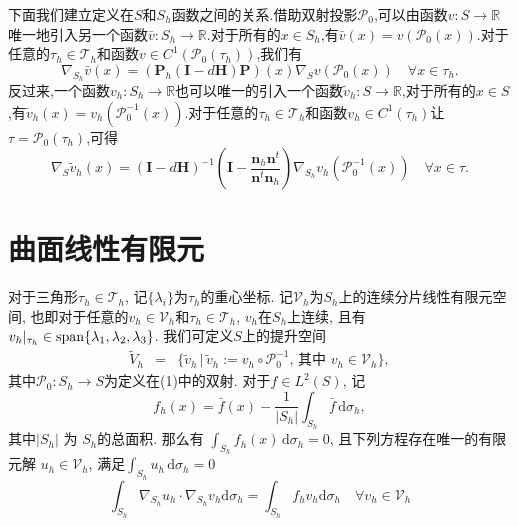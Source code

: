 \documentclass{article}
\begin{document}
下面我们建立定义在$S$和$S_h$函数之间的关系.借助双射投影$\mathcal{P}_0$,可以由函数$v:S\rightarrow\mathbb{R}$唯一地引入另一个函数$\bar{v}:S_h\rightarrow\mathbb{R}$.对于所有的$x\in S_h$,有$\bar{v}(x)=v(\mathcal{P}_0(x))$.对于任意的$\tau_h\in\mathcal{T}_h$和函数$v\in C^1(\mathcal{P}_0(\tau_h))$,我们有
\begin{equation*}
\nabla_{S_h}\bar{v}(x)=(\boldsymbol{P}_h(\boldsymbol{I}-d\boldsymbol{H})\boldsymbol{P})(x)\nabla_{S}v(\mathcal{P}_0(x))\quad\forall x\in \tau_h.
\end{equation*}
反过来,一个函数$v_h:S_h\rightarrow\mathbb{R}$也可以唯一的引入一个函数$\tilde{v}_h:S\rightarrow\mathbb{R}$,对于所有的$x\in S$,有$\tilde{v}_h(x)=v_h(\mathcal{P}^{-1}_0(x))$.对于任意的$\tau_h\in\mathcal{T}_h$和函数$v_h\in C^1(\tau_h)$让$\tau=\mathcal{P}_0(\tau_h)$,可得
\begin{equation*}
\nabla_{S}\tilde{v}_h(x)=(\boldsymbol{I}-d\boldsymbol{H})^{-1}\left(\boldsymbol{I}-\frac{\boldsymbol{n}_h\boldsymbol{n}^t}{\boldsymbol{n}^t\boldsymbol{n}_h}\right)\nabla_{S_h}v_h(\mathcal{P}^{-1}_0(x))\quad\forall x\in\tau.
\end{equation*}

\newpage

\section{曲面线性有限元}

对于三角形$\tau_h\in\mathcal{T}_h$, 记$\{\lambda_i\}$为$\tau_h$的重心坐标.   
记$\mathcal V_h$为$S_h$上的连续分片线性有限元空间, 也即对于任意的$v_h\in \mathcal V_h$和$\tau_h \in \mathcal T_h$,
$v_h$在$S_h$上连续, 且有$v_h|_{\tau_h}\in {\rm span}\{\lambda_1,\lambda_2,\lambda_3\}$.  
我们可定义$S$上的提升空间
\begin{eqnarray*}
 \tilde{V}_{h} & = &
\{\tilde{v}_{h} \, | \, \tilde{v}_{h}:=v_{h}\circ\mathcal{P}_{0}^{-1},\,
\text{其中 }v_{h}\in \mathcal V_h\},
\end{eqnarray*}
其中$\mathcal P_0: S_h \to S$为定义在(1)中的双射.   
对于$f\in L^{2}(S)$, 记
\begin{equation}\label{eq:fh}
f_{h}(x)=\bar{f}(x)-\frac{1}{|S_{h}|}\int_{S_{h}} \bar f \, \mathrm{d}\sigma_{h},
\end{equation}
其中$|S_{h}|$ 为 $ S_{h}$的总面积. 那么有
$\int_{S_{h}}f_{h}(x)\,\mathrm{d}\sigma_{h}=0$, 且下列方程存在唯一的有限元解
$u_{h}\in \mathcal V_h$, 满足$\int_{S_{h}}u_{h}\,\mathrm{d}\sigma_{h}=0$
\begin{equation*}
\int_{S_h}\nabla_{S_h}u_h\cdot\nabla_{S_h}v_h\mathrm{d}\sigma_h=\int_{S_h}f_hv_h\mathrm{d}\sigma_h\quad\forall v_h\in\mathcal{V}_h
\end{equation*}
\newpage
\end{document}
